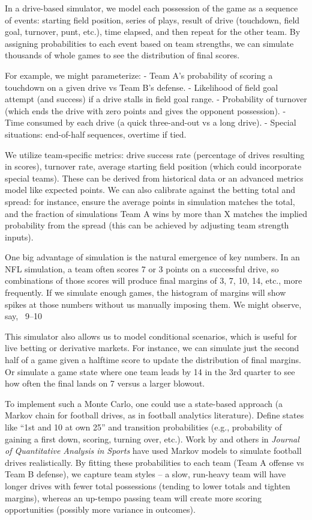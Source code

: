 \documentclass[11pt]{amsart}
\begin{document}
In a drive-based simulator, we model each possession of the game as a sequence of events: starting field position, series of plays, result of drive (touchdown, field goal, turnover, punt, etc.), time elapsed, and then repeat for the other team. By assigning probabilities to each event based on team strengths, we can simulate thousands of whole games to see the distribution of final scores.

For example, we might parameterize:
- Team A’s probability of scoring a touchdown on a given drive vs Team B’s defense.
- Likelihood of field goal attempt (and success) if a drive stalls in field goal range.
- Probability of turnover (which ends the drive with zero points and gives the opponent possession).
- Time consumed by each drive (a quick three-and-out vs a long drive).
- Special situations: end-of-half sequences, overtime if tied.

We utilize team-specific metrics: drive success rate (percentage of drives resulting in scores), turnover rate, average starting field position (which could incorporate special teams). These can be derived from historical data or an advanced metrics model like expected points. We can also calibrate against the betting total and spread: for instance, ensure the average points in simulation matches the total, and the fraction of simulations Team A wins by more than X matches the implied probability from the spread (this can be achieved by adjusting team strength inputs).

One big advantage of simulation is the natural emergence of key numbers. In an NFL simulation, a team often scores 7 or 3 points on a successful drive, so combinations of those scores will produce final margins of 3, 7, 10, 14, etc., more frequently. If we simulate enough games, the histogram of margins will show spikes at those numbers without us manually imposing them. We might observe, say, ~9–10%

This simulator also allows us to model conditional scenarios, which is useful for live betting or derivative markets. For instance, we can simulate just the second half of a game given a halftime score to update the distribution of final margins. Or simulate a game state where one team leads by 14 in the 3rd quarter to see how often the final lands on 7 versus a larger blowout.

To implement such a Monte Carlo, one could use a state-based approach (a Markov chain for football drives, as in football analytics literature). Define states like “1st and 10 at own 25” and transition probabilities (e.g., probability of gaining a first down, scoring, turning over, etc.). Work by \citet{LockNettleton2014} and others in \textit{Journal of Quantitative Analysis in Sports} have used Markov models to simulate football drives realistically. By fitting these probabilities to each team (Team A offense vs Team B defense), we capture team styles – a slow, run-heavy team will have longer drives with fewer total possessions (tending to lower totals and tighten margins), whereas an up-tempo passing team will create more scoring opportunities (possibly more variance in outcomes).
\end{document}
